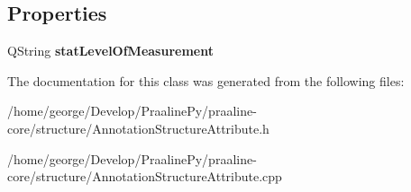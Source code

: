 \subsection*{Properties}
\begin{DoxyCompactItemize}
\item 
\mbox{\label{class_annotation_structure_attribute_ac857eccd100ad3841c3d8be0000d378b}} 
Q\+String {\bfseries stat\+Level\+Of\+Measurement}
\end{DoxyCompactItemize}


The documentation for this class was generated from the following files\+:\begin{DoxyCompactItemize}
\item 
/home/george/\+Develop/\+Praaline\+Py/praaline-\/core/structure/Annotation\+Structure\+Attribute.\+h\item 
/home/george/\+Develop/\+Praaline\+Py/praaline-\/core/structure/Annotation\+Structure\+Attribute.\+cpp\end{DoxyCompactItemize}

